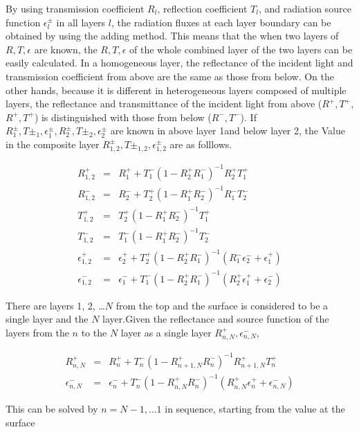 By using transmission coefficient \(R_l\), reflection coefficient
\(T_l\), and radiation source function \(\epsilon^\pm_l\) in all
layers \(l\), the radiation fluxes at each layer boundary can be
obtained by using the adding method. 
This means that the when two layers of
\(R,T,\epsilon\) are known, the \(R,T,\epsilon\) of the whole combined
layer of the two layers can be easily calculated. 
In a homogeneous layer, the
reflectance of the incident light and transmission
coefficient  from above are the same as those from below.
On the other hands, because it is different in
heterogeneous layers composed of multiple layers, the reflectance and transmittance of the incident light from above
(\(R^+, T^+\), \(R^+, T^+\)) is distinguished with those from below (\(R^-, T^-\)). 
If \(R^\pm_1, T\pm_1, \epsilon^\pm_1,  R^\pm_2, T\pm_2, \epsilon^\pm_2\)
are known in above layer 1and below layer 2, the Value in the composite layer
\(R^\pm_{1,2}, T\pm_{1,2}, \epsilon^\pm_{1,2}\) are as folllows.  

\begin{eqnarray}
  R^+_{1,2} & = & R^+_1 + T^-_1 ( 1- R^+_2 R^-_1 )^{-1} R^+_2 T^+_1 \\
  R^-_{1,2} & = & R^-_2 + T^+_2 ( 1- R^+_1 R^-_2 )^{-1} R^-_1 T^-_2 \\
  T^+_{1,2} & = & T^+_2 ( 1- R^+_1 R^-_2 )^{-1} T^+_1 \\
  T^-_{1,2} & = & T^-_1 ( 1- R^+_1 R^-_2 )^{-1} T^-_2 \\
  \epsilon^+_{1,2} & = & \epsilon^+_2 
    + T^+_2 ( 1- R^+_2 R^-_1 )^{-1} ( R^-_1 \epsilon^-_2 + \epsilon^+_1 ) \\
  \epsilon^-_{1,2} & = & \epsilon^-_1 
    + T^-_1 ( 1- R^+_2 R^-_1 )^{-1} ( R^+_2 \epsilon^+_1 + \epsilon^-_2 ) 
\end{eqnarray}

There are layers 1, 2, \ldots{}\(N\) from the top and the surface is considered to be a single layer and the \(N\) layer.Given the reflectance and source function of the layers from the \(n\) to the
\(N\) layer as a single layer \(R^+_{n,N}, \epsilon^-_{n,N}\),

\begin{eqnarray}
  R^+_{n,N} & = & R^+_n 
      + T^-_n ( 1- R^+_{n+1,N} R^-_n )^{-1} R^+_{n+1,N} T^+_n \\
  \epsilon^-_{n,N} & = & \epsilon^-_n
    + T^-_n ( 1- R^+_{n,N} R^-_n )^{-1} 
      ( R^+_{n,N} \epsilon^+_n + \epsilon^-_{n,N} ) 
\end{eqnarray}

This can be solved by \(n=N-1, \ldots 1\) in sequence, starting from the value at the surface

